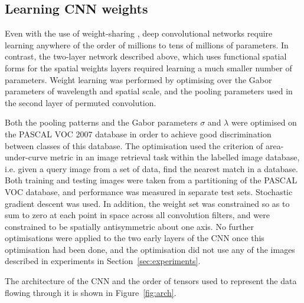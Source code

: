 \subsection{Learning CNN weights}

Even with the use of weight-sharing \cite{lecun1995convolutional}, deep convolutional networks require learning anywhere of the order of millions to tens of millions of parameters. In contrast, the two-layer network described above, which uses functional spatial forms for the spatial weights layers required learning a much smaller number of parameters.  Weight learning was performed by optimising over the Gabor parameters of wavelength and spatial scale, and the pooling parameters used in the second layer of permuted convolution.

Both the pooling patterns and the Gabor parameters $\sigma$ and $\lambda$ were optimised on the PASCAL VOC 2007 database \cite{everingham2010pascal} in order to achieve good discrimination between classes of this database. The optimisation used the criterion of area-under-curve metric in an image retrieval task within the labelled image database, i.e. given a query image from a set of data, find the nearest match in a database.  Both training and testing images were taken from a partitioning of the PASCAL VOC database, and performance was measured in separate test sets.  Stochastic gradient descent was used. In addition, the weight set was constrained so as to sum to zero at each point in space across all convolution filters, and were constrained to be spatially antisymmetric about one axis.  No further optimisations were applied to the two early layers of the CNN once this optimisation had been done, and the optimisation did not use any of the images described in experiments in Section~\ref{sec:experiments}.

The architecture of the CNN and the order of tensors used to represent the data flowing through it is shown in Figure~\ref{fig:arch}.

